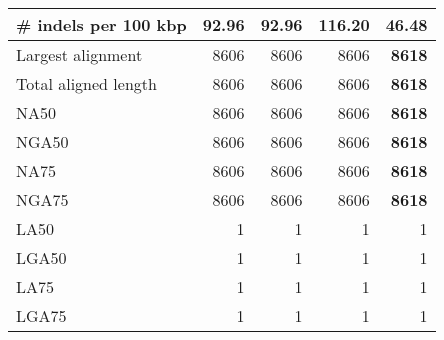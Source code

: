 \documentclass[12pt,a4paper]{article}
\begin{document}
\begin{table}[ht]
\begin{center}
\begin{tabular}{|l*{4}{|r}|}
\# indels per 100 kbp & 92.96 & 92.96 & 116.20 & {\bf 46.48} \\ \hline
Largest alignment & 8606 & 8606 & 8606 & {\bf 8618} \\ \hline
Total aligned length & 8606 & 8606 & 8606 & {\bf 8618} \\ \hline
NA50 & 8606 & 8606 & 8606 & {\bf 8618} \\ \hline
NGA50 & 8606 & 8606 & 8606 & {\bf 8618} \\ \hline
NA75 & 8606 & 8606 & 8606 & {\bf 8618} \\ \hline
NGA75 & 8606 & 8606 & 8606 & {\bf 8618} \\ \hline
LA50 & 1 & 1 & 1 & 1 \\ \hline
LGA50 & 1 & 1 & 1 & 1 \\ \hline
LA75 & 1 & 1 & 1 & 1 \\ \hline
LGA75 & 1 & 1 & 1 & 1 \\ \hline
\end{tabular}
\end{center}
\end{table}
\end{document}

